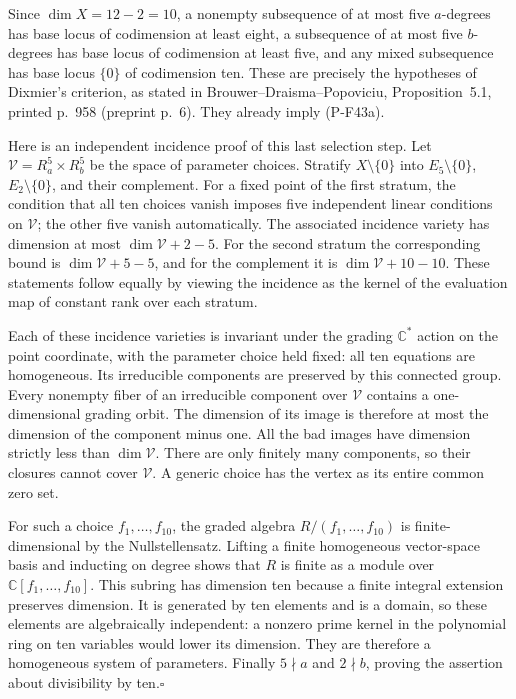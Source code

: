 Since $\dim X=12-2=10$, a nonempty subsequence of at most
five $a$-degrees has base locus of codimension at least
eight, a subsequence of at most five $b$-degrees has base
locus of codimension at least five, and any mixed
subsequence has base locus $\{0\}$ of codimension ten.
These are precisely the hypotheses of Dixmier's criterion,
as stated in Brouwer--Draisma--Popoviciu, Proposition~5.1,
printed p.~958 (preprint p.~6). They already imply (P-F43a).

Here is an independent incidence proof of this last
selection step. Let $\mathcal V=R_a^5\times R_b^5$ be the
space of parameter choices. Stratify $X\setminus\{0\}$
into $E_5\setminus\{0\}$, $E_2\setminus\{0\}$, and their
complement. For a fixed point of the first stratum, the
condition that all ten choices vanish imposes five
independent linear conditions on $\mathcal V$; the other
five vanish automatically. The associated incidence
variety has dimension at most $\dim\mathcal V+2-5$.
For the second stratum the corresponding bound is
$\dim\mathcal V+5-5$, and for the complement it is
$\dim\mathcal V+10-10$. These statements follow equally
by viewing the incidence as the kernel of the evaluation
map of constant rank over each stratum.

Each of these incidence varieties is invariant under
the grading $\mathbb C^*$ action on the point coordinate,
with the parameter choice held fixed: all ten equations
are homogeneous. Its irreducible components are preserved
by this connected group. Every nonempty fiber of an
irreducible component over $\mathcal V$ contains a
one-dimensional grading orbit. The dimension of its image
is therefore at most the dimension of the component minus
one. All the bad images have dimension strictly less than
$\dim\mathcal V$. There are only finitely many components,
so their closures cannot cover $\mathcal V$. A generic
choice has the vertex as its entire common zero set.

For such a choice $f_1,\ldots,f_{10}$, the graded algebra
$R/(f_1,\ldots,f_{10})$ is finite-dimensional by the
Nullstellensatz. Lifting a finite homogeneous vector-space
basis and inducting on degree shows that $R$ is finite as
a module over $\mathbb C[f_1,\ldots,f_{10}]$. This subring
has dimension ten because a finite integral extension
preserves dimension. It is generated by ten elements and
is a domain, so these elements are algebraically
independent: a nonzero prime kernel in the polynomial
ring on ten variables would lower its dimension. They
are therefore a homogeneous system of parameters.
Finally $5\nmid a$ and $2\nmid b$, proving the assertion
about divisibility by ten.\hfill$\square$

